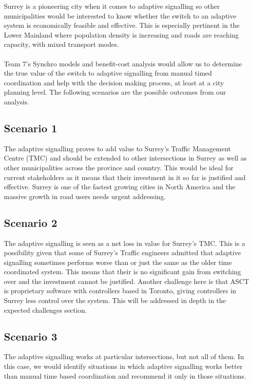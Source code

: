 Surrey is a pioneering city when it comes to adaptive signalling so other municipalities would be interested to know whether the switch to an adaptive system is economically feasible and effective. This is especially pertinent in the Lower Mainland where population density is increasing and roads are reaching capacity, with mixed transport modes.  \\ \\
Team 7’s Synchro models and benefit-cost analysis would allow us to determine the true value of the switch to adaptive signalling from manual timed coordination and help with the decision making process, at least at a city planning level. The following scenarios are the possible outcomes from our analysis.

\subsection*{Scenario 1}
The adaptive signalling proves to add value to Surrey’s Traffic Management Centre (TMC) and should be extended to other intersections in Surrey as well as other municipalities across the province and country. This would be ideal for current stakeholders as it means that their investment in it so far is justified and effective. Surrey is one of the fastest growing cities in North America and the massive growth in road users needs urgent addressing. 

\subsection*{Scenario 2}
The adaptive signalling is seen as a net loss in value for Surrey’s TMC. This is a possibility given that some of Surrey’s Traffic engineers admitted that adaptive signalling sometimes performs worse than or just the same as the older time coordinated system. This means that their is no significant gain from switching over and the investment cannot be justified. Another challenge here is that ASCT is proprietary software with controllers based in Toronto, giving controllers in Surrey less control over the system. This will be addressed in depth in the expected challenges section.

\subsection*{Scenario 3}
The adaptive signalling works at particular intersections, but not all of them. In this case, we would identify situations in which adaptive signalling works better than manual time based coordination and recommend it only in those situations. 

